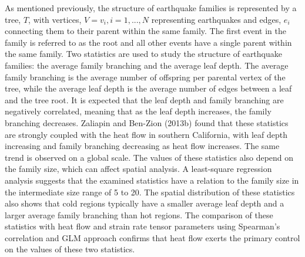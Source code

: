 \documentclass[12pt]{article} %
\theoremstyle{plain}
\begin{document}
	
	As mentioned previously, the structure of earthquake families is represented by a tree, $T$, with vertices, $V={v_i}, i = 1,...,N$ representing earthquakes and edges, ${e_i}$ connecting them to their parent within the same family. The first event in the family is referred to as the root and all other events have a single parent within the same family. Two statistics are used to study the structure of earthquake families: the average family branching and the average leaf depth. The average family branching is the average number of offspring per parental vertex of the tree, while the average leaf depth is the average number of edges between a leaf and the tree root. It is expected that the leaf depth and family branching are negatively correlated, meaning that as the leaf depth increases, the family branching decreases. Zaliapin and Ben-Zion (2013b) found that these statistics are strongly coupled with the heat flow in southern California, with leaf depth increasing and family branching decreasing as heat flow increases. The same trend is observed on a global scale. The values of these statistics also depend on the family size, which can affect spatial analysis. A least-square regression analysis suggests that the examined statistics have a relation to the family size in the intermediate size range of 5 to 20. The spatial distribution of these statistics also shows that cold regions typically have a smaller average leaf depth and a larger average family branching than hot regions. The comparison of these statistics with heat flow and strain rate tensor parameters using Spearman's correlation and GLM approach confirms that heat flow exerts the primary control on the values of these two statistics.
	
\end{document}
